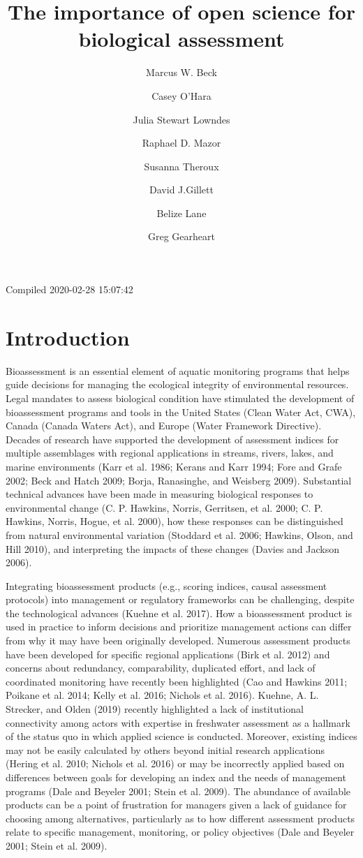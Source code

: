 \documentclass[fleqn,10pt,lineno]{wlpeerj} %
\title{The importance of open science for biological assessment}
\author[1]{Marcus W. Beck}
\author[2]{Casey O'Hara}
\author[2]{Julia Stewart Lowndes}
\author[1]{Raphael D. Mazor}
\author[]{Susanna Theroux}
\author[1]{David J.Gillett}
\author[3]{Belize Lane}
\author[4]{Greg Gearheart}
\affil[1]{Southern California Coastal Water Research Project, 3535 Harbor Blvd}
\affil[2]{National Center for Ecological Analysis and Synthesis, 735 State St}
\affil[3]{Utah State University, 1600 Canyon Rd, Logan,UT 84321 USA}
\affil[4]{California State Water Resources Control Board, 1001 I Street, Sacramenta, CA 95814 USA}
\begin{document}
\flushbottom
\maketitle
\thispagestyle{empty}

Compiled 2020-02-28 15:07:42

\hypertarget{introduction}{%
\section{Introduction}\label{introduction}}

Bioassessment is an essential element of aquatic monitoring programs that helps guide decisions for managing the ecological integrity of environmental resources. Legal mandates to assess biological condition have stimulated the development of bioassessment programs and tools in the United States (Clean Water Act, CWA), Canada (Canada Waters Act), and Europe (Water Framework Directive). Decades of research have supported the development of assessment indices for multiple assemblages with regional applications in streams, rivers, lakes, and marine environments (Karr et al. 1986; Kerans and Karr 1994; Fore and Grafe 2002; Beck and Hatch 2009; Borja, Ranasinghe, and Weisberg 2009). Substantial technical advances have been made in measuring biological responses to environmental change (C. P. Hawkins, Norris, Gerritsen, et al. 2000; C. P. Hawkins, Norris, Hogue, et al. 2000), how these responses can be distinguished from natural environmental variation (Stoddard et al. 2006; Hawkins, Olson, and Hill 2010), and interpreting the impacts of these changes (Davies and Jackson 2006).

Integrating bioassessment products (e.g., scoring indices, causal assessment protocols) into management or regulatory frameworks can be challenging, despite the technological advances (Kuehne et al. 2017). How a bioassessment product is used in practice to inform decisions and prioritize management actions can differ from why it may have been originally developed. Numerous assessment products have been developed for specific regional applications (Birk et al. 2012) and concerns about redundancy, comparability, duplicated effort, and lack of coordinated monitoring have recently been highlighted (Cao and Hawkins 2011; Poikane et al. 2014; Kelly et al. 2016; Nichols et al. 2016). Kuehne, A. L. Strecker, and Olden (2019) recently highlighted a lack of institutional connectivity among actors with expertise in freshwater assessment as a hallmark of the status quo in which applied science is conducted. Moreover, existing indices may not be easily calculated by others beyond initial research applications (Hering et al. 2010; Nichols et al. 2016) or may be incorrectly applied based on differences between goals for developing an index and the needs of management programs (Dale and Beyeler 2001; Stein et al. 2009). The abundance of available products can be a point of frustration for managers given a lack of guidance for choosing among alternatives, particularly as to how different assessment products relate to specific management, monitoring, or policy objectives (Dale and Beyeler 2001; Stein et al. 2009).
\end{document}
